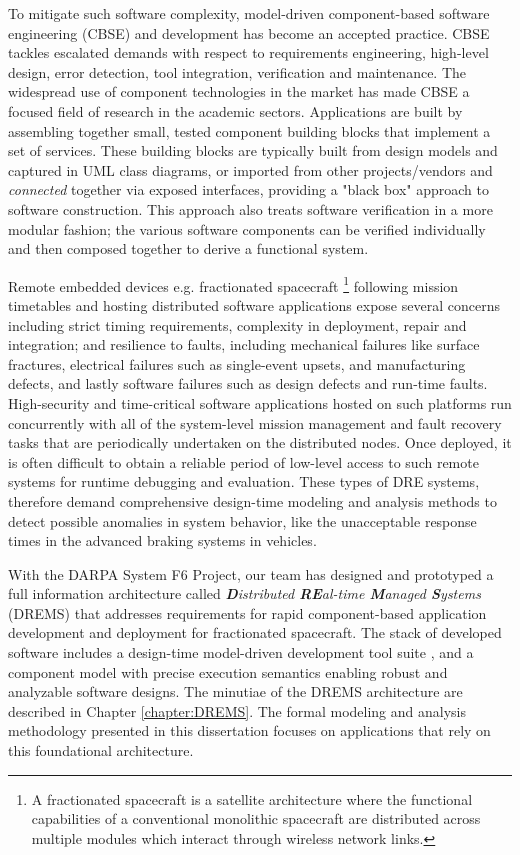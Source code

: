 To mitigate such software complexity, model-driven component-based software engineering (CBSE) and development \cite{beydeda2005model, heineman2001component, clemens1998component, simulink1993mathworks, autosar} has become an accepted practice. CBSE tackles escalated demands with respect to requirements engineering, high-level design, error detection, tool integration, verification and maintenance. The widespread use of component technologies in the market has made CBSE a focused field of research in the academic sectors. Applications are built by assembling together small, tested component building blocks that implement a set of services. These building blocks are typically built from design models and captured in UML \cite{UML} class diagrams, or imported from other projects/vendors and \emph{connected} together via exposed interfaces, providing a "black box" approach to software construction. This approach also treats software verification in a more modular fashion; the various software components can be verified individually and then composed together to derive a functional system. 

Remote embedded devices e.g. fractionated spacecraft \footnote{A fractionated spacecraft is a satellite architecture where the functional capabilities of a conventional monolithic spacecraft are distributed across multiple modules which interact through wireless network links.} following mission timetables and hosting distributed software applications expose several concerns including strict timing requirements, complexity in deployment, repair and integration; and resilience to faults, including mechanical failures like surface fractures, electrical failures such as single-event upsets, and manufacturing defects, and lastly software failures such as design defects and run-time faults. High-security and time-critical software applications hosted on such platforms run concurrently with all of the system-level mission management and fault recovery tasks that are periodically undertaken on the distributed nodes. Once deployed, it is often difficult to obtain a reliable period of low-level access to such remote systems for runtime debugging and evaluation. These types of DRE systems, therefore demand comprehensive design-time modeling and analysis methods to detect possible anomalies in system behavior, like the unacceptable response times in the advanced braking systems in vehicles. 

With the DARPA System F6 Project, our team has designed and prototyped a full information architecture called \emph{\textbf{D}istributed \textbf{RE}al-time \textbf{M}anaged \textbf{S}ystems} (DREMS) \cite{ISIS_F6_Aerospace:12,DREMS13Software} that addresses requirements for rapid component-based application development and deployment for fractionated spacecraft. The stack of developed software includes a  design-time model-driven development tool suite \cite{ISIS_F6_SFFMT:13}, and a component model \cite{ISIS_F6_ISORC:13} with precise execution semantics enabling robust and analyzable software designs. The minutiae of the DREMS architecture are described in Chapter \ref{chapter:DREMS}. The formal modeling and analysis methodology presented in this dissertation focuses on applications that rely on this foundational architecture. 

